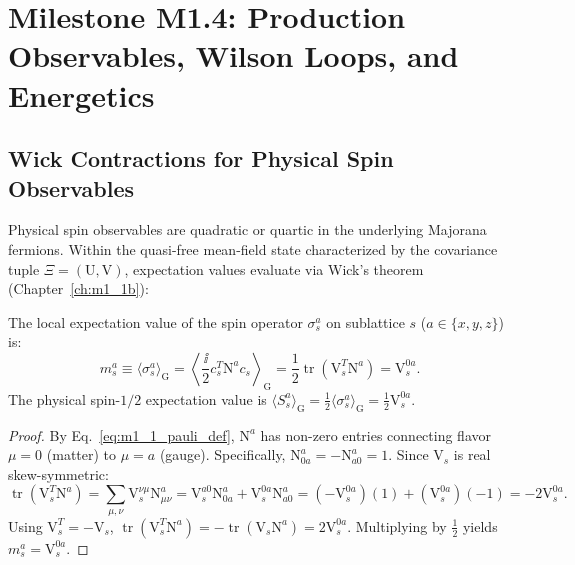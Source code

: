 \chapter{Milestone M1.4: Production Observables, Wilson Loops, and Energetics}
\label{ch:m1_4}

\section{Wick Contractions for Physical Spin Observables}
\label{sec:m1_4_spin_observables}

Physical spin observables are quadratic or quartic in the underlying Majorana fermions. Within the quasi-free mean-field state characterized by the covariance tuple $\Xi = (\mathrm{U}, \mathrm{V})$, expectation values evaluate via Wick's theorem (Chapter~\ref{ch:m1_1b}):

\begin{definition}
\label{def:m1_4_magnetization}
The local expectation value of the spin operator $\sigma_s^a$ on sublattice $s$ ($a \in \{x, y, z\}$) is:
\begin{equation}
\label{eq:m1_4_magnetization}
m_s^a \equiv \langle \sigma_s^a \rangle_{\mathrm{G}} = \left\langle \frac{\ii}{2} c_s^T \mathrm{N}^a c_s \right\rangle_{\mathrm{G}} = \frac{1}{2} \operatorname{tr}(\mathrm{V}_s^T \mathrm{N}^a) = \mathrm{V}_s^{0a}.
\end{equation}
The physical spin-$1/2$ expectation value is $\langle S_s^a \rangle_{\mathrm{G}} = \frac{1}{2}\langle \sigma_s^a \rangle_{\mathrm{G}} = \frac{1}{2}\mathrm{V}_s^{0a}$.
\end{definition}
\begin{proof}
By Eq.~\eqref{eq:m1_1_pauli_def}, $\mathrm{N}^a$ has non-zero entries connecting flavor $\mu = 0$ (matter) to $\mu = a$ (gauge). Specifically, $\mathrm{N}_{0a}^a = -\mathrm{N}_{a0}^a = 1$. Since $\mathrm{V}_s$ is real skew-symmetric:
\begin{equation}
\operatorname{tr}(\mathrm{V}_s^T \mathrm{N}^a) = \sum_{\mu,\nu} \mathrm{V}_s^{\nu\mu} \mathrm{N}_{\mu\nu}^a = \mathrm{V}_s^{a0}\mathrm{N}_{0a}^a + \mathrm{V}_s^{0a}\mathrm{N}_{a0}^a = (-\mathrm{V}_s^{0a})(1) + (\mathrm{V}_s^{0a})(-1) = -2\mathrm{V}_s^{0a}.
\end{equation}
Using $\mathrm{V}_s^T = -\mathrm{V}_s$, $\operatorname{tr}(\mathrm{V}_s^T \mathrm{N}^a) = -\operatorname{tr}(\mathrm{V}_s \mathrm{N}^a) = 2\mathrm{V}_s^{0a}$. Multiplying by $\frac{1}{2}$ yields $m_s^a = \mathrm{V}_s^{0a}$.
\end{proof}

